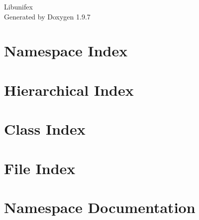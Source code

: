 \documentclass[twoside]{book}
\newcommand{\+}{\discretionary{\mbox{\scriptsize$\hookleftarrow$}}{}{}}
\newcommand{\clearemptydoublepage}{%
    \newpage{\pagestyle{empty}\cleardoublepage}%
  }
\begin{document}
  \raggedbottom
    \hypersetup{pageanchor=false,
                bookmarksnumbered=true,
                pdfencoding=unicode
               }
  \begin{titlepage}
  \vspace*{7cm}
  \begin{center}%
  {\Large Libunifex}\\
  \vspace*{1cm}
  {\large Generated by Doxygen 1.9.7}\\
  \end{center}
  \end{titlepage}
  \clearemptydoublepage
  \tableofcontents
  \clearemptydoublepage
  \hypersetup{pageanchor=true}
\chapter{Namespace Index}

\chapter{Hierarchical Index}

\chapter{Class Index}

\chapter{File Index}

\chapter{Namespace Documentation}

\end{document}
